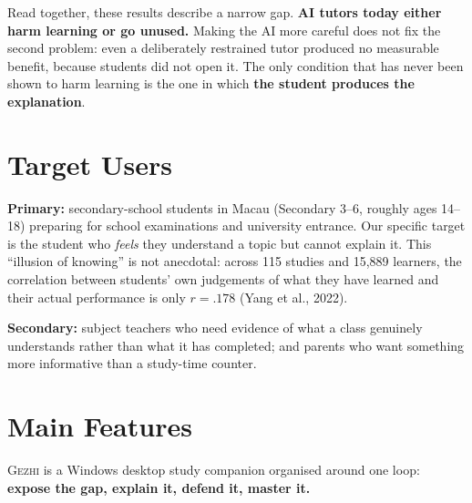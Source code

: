 \documentclass[10pt,a4paper]{article}
\newcommand{\gezhi}{\textsc{Gezhi}}
\begin{document}
\vspace{-4pt}
Read together, these results describe a narrow gap. \textbf{AI tutors today either harm
learning or go unused.} Making the AI more careful does not fix the second problem: even a
deliberately restrained tutor produced no measurable benefit, because students did not
open it. The only condition that has never been shown to harm learning is the one in which
\textbf{the student produces the explanation}.

\section{Target Users}

\textbf{Primary:} secondary-school students in Macau (Secondary 3--6, roughly ages 14--18)
preparing for school examinations and university entrance. Our specific target is the
student who \emph{feels} they understand a topic but cannot explain it. This ``illusion of
knowing'' is not anecdotal: across 115 studies and 15{,}889 learners, the correlation
between students' own judgements of what they have learned and their actual performance is
only \(r = .178\) (Yang et al., 2022).

\textbf{Secondary:} subject teachers who need evidence of what a class genuinely
understands rather than what it has completed; and parents who want something more
informative than a study-time counter.

\section{Main Features}

\gezhi{} is a Windows desktop study companion organised around one loop:
\textbf{expose the gap, explain it, defend it, master it.}
\end{document}
